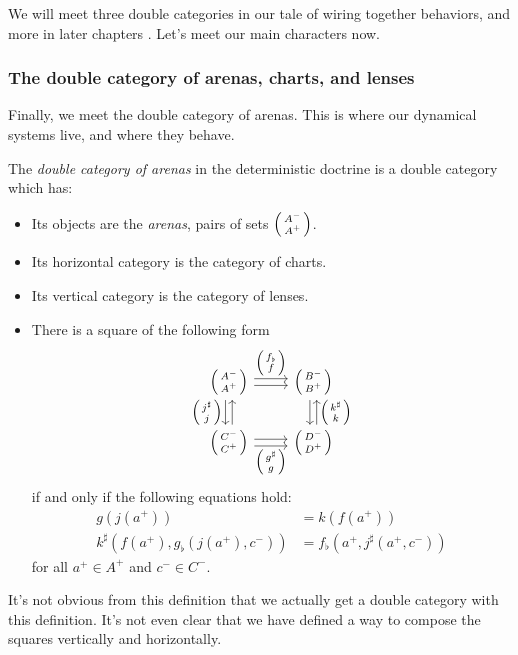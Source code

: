\documentclass[DynamicalBook]{subfiles}
\begin{document}
We will meet three double categories in our tale of wiring together behaviors,
and more in later chapters .
Let's meet our main characters now.

\subsubsection{The double category of arenas, charts, and
  lenses}\label{sec.double_cat_arenas}

Finally, we meet the double category of arenas. This is where our dynamical
systems live, and where they behave.

\begin{definition}\label{def.double_category_of_arenas_discrete}
  The \emph{double category of arenas} in the deterministic doctrine is a double
  category which has:
  \begin{itemize}
  \item Its objects are the \emph{arenas}, pairs of sets $\lens{A^-}{A^+}$.
  \item Its horizontal category is the category of charts.
  \item Its vertical category is the category of lenses.
  \item There is a square of the following form
    \begin{equation}\label{eqn.dbl_cat_arena_square}
      \begin{tikzcd}
        \lens{A^-}{A^+} \ar[r, shift left, "\lens{f_{\flat}}{f}"] \ar[r, shift
        right] \ar[d, shift right, "\lens{j^{\sharp}}{j}"'] \ar[d, shift left,
        leftarrow] & \lens{B^-}{B^+} \ar[d, shift left, leftarrow,
        "\lens{k^{\sharp}}{k}"] \ar[d, shift right]\\
        \lens{C^-}{C^+} \ar[r, shift right, "\lens{g^{\sharp}}{g}"'] \ar[r,
        shift left] & \lens{D^-}{D^+}
      \end{tikzcd}
    \end{equation}
    if and only if the following equations hold:
    \begin{align}\label{eqn.dbl_cat_arena_square_commuting}
      g(j(a^+)) &= k(f(a^+)) \\
      k^{\sharp}(f(a^+), g_{\flat}(j(a^+), c^-)) &= f_{\flat}(a^+, j^{\sharp}(a^+, c^-)) 
    \end{align}
    for all $a^+ \in A^+$ and $c^- \in C^-$.
  \end{itemize}
\end{definition}

It's not obvious from this definition that we actually get a double category
with this definition. It's not even clear that we have defined a way to compose
the squares vertically and horizontally.
\end{document}
